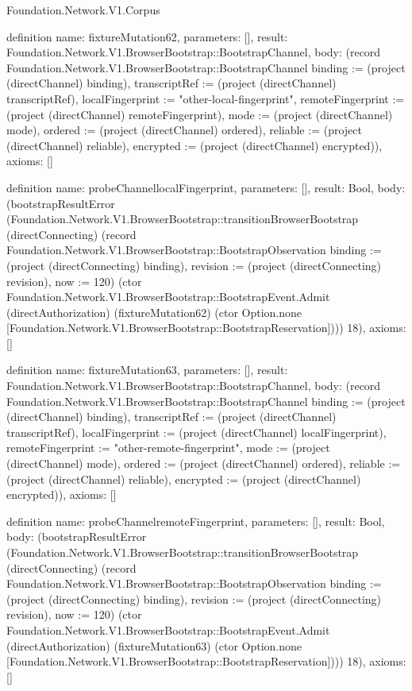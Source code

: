 \begin{lexlean}{Foundation.Network.V1.Corpus}
\begin{semanticmodule}
definition{
  name: fixtureMutation62,
  parameters: [],
  result: Foundation.Network.V1.BrowserBootstrap::BootstrapChannel,
  body: (record Foundation.Network.V1.BrowserBootstrap::BootstrapChannel {binding := (project (directChannel) binding), transcriptRef := (project (directChannel) transcriptRef), localFingerprint := "other-local-fingerprint", remoteFingerprint := (project (directChannel) remoteFingerprint), mode := (project (directChannel) mode), ordered := (project (directChannel) ordered), reliable := (project (directChannel) reliable), encrypted := (project (directChannel) encrypted)}),
  axioms: []
}

definition{
  name: probeChannellocalFingerprint,
  parameters: [],
  result: Bool,
  body: (bootstrapResultError (Foundation.Network.V1.BrowserBootstrap::transitionBrowserBootstrap (directConnecting) (record Foundation.Network.V1.BrowserBootstrap::BootstrapObservation {binding := (project (directConnecting) binding), revision := (project (directConnecting) revision), now := 120}) (ctor Foundation.Network.V1.BrowserBootstrap::BootstrapEvent.Admit (directAuthorization) (fixtureMutation62) (ctor Option.none [Foundation.Network.V1.BrowserBootstrap::BootstrapReservation]))) 18),
  axioms: []
}

definition{
  name: fixtureMutation63,
  parameters: [],
  result: Foundation.Network.V1.BrowserBootstrap::BootstrapChannel,
  body: (record Foundation.Network.V1.BrowserBootstrap::BootstrapChannel {binding := (project (directChannel) binding), transcriptRef := (project (directChannel) transcriptRef), localFingerprint := (project (directChannel) localFingerprint), remoteFingerprint := "other-remote-fingerprint", mode := (project (directChannel) mode), ordered := (project (directChannel) ordered), reliable := (project (directChannel) reliable), encrypted := (project (directChannel) encrypted)}),
  axioms: []
}

definition{
  name: probeChannelremoteFingerprint,
  parameters: [],
  result: Bool,
  body: (bootstrapResultError (Foundation.Network.V1.BrowserBootstrap::transitionBrowserBootstrap (directConnecting) (record Foundation.Network.V1.BrowserBootstrap::BootstrapObservation {binding := (project (directConnecting) binding), revision := (project (directConnecting) revision), now := 120}) (ctor Foundation.Network.V1.BrowserBootstrap::BootstrapEvent.Admit (directAuthorization) (fixtureMutation63) (ctor Option.none [Foundation.Network.V1.BrowserBootstrap::BootstrapReservation]))) 18),
  axioms: []
}


\end{semanticmodule}
\end{lexlean}
